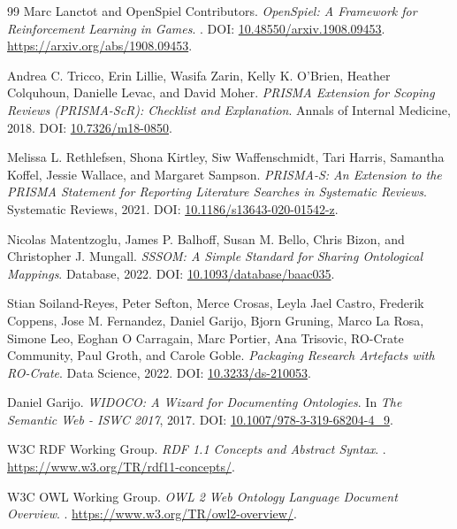 \documentclass[11pt]{article}
\begin{document}
\begin{thebibliography}{99}
Marc Lanctot and OpenSpiel Contributors.
\newblock \emph{OpenSpiel: A Framework for Reinforcement Learning in Games}.
. DOI: \href{https://doi.org/10.48550/arxiv.1908.09453}{10.48550/arxiv.1908.09453}. \url{https://arxiv.org/abs/1908.09453}.

Andrea C. Tricco, Erin Lillie, Wasifa Zarin, Kelly K. O'Brien, Heather Colquhoun, Danielle Levac, and David Moher.
\newblock \emph{PRISMA Extension for Scoping Reviews (PRISMA-ScR): Checklist and Explanation}.
\newblock Annals of Internal Medicine, 2018. DOI: \href{https://doi.org/10.7326/m18-0850}{10.7326/m18-0850}.

Melissa L. Rethlefsen, Shona Kirtley, Siw Waffenschmidt, Tari Harris, Samantha Koffel, Jessie Wallace, and Margaret Sampson.
\newblock \emph{PRISMA-S: An Extension to the PRISMA Statement for Reporting Literature Searches in Systematic Reviews}.
\newblock Systematic Reviews, 2021. DOI: \href{https://doi.org/10.1186/s13643-020-01542-z}{10.1186/s13643-020-01542-z}.

Nicolas Matentzoglu, James P. Balhoff, Susan M. Bello, Chris Bizon, and Christopher J. Mungall.
\newblock \emph{SSSOM: A Simple Standard for Sharing Ontological Mappings}.
\newblock Database, 2022. DOI: \href{https://doi.org/10.1093/database/baac035}{10.1093/database/baac035}.

Stian Soiland-Reyes, Peter Sefton, Merce Crosas, Leyla Jael Castro, Frederik Coppens, Jose M. Fernandez, Daniel Garijo, Bjorn Gruning, Marco La Rosa, Simone Leo, Eoghan O Carragain, Marc Portier, Ana Trisovic, RO-Crate Community, Paul Groth, and Carole Goble.
\newblock \emph{Packaging Research Artefacts with RO-Crate}.
\newblock Data Science, 2022. DOI: \href{https://doi.org/10.3233/ds-210053}{10.3233/ds-210053}.

Daniel Garijo.
\newblock \emph{WIDOCO: A Wizard for Documenting Ontologies}.
\newblock In \emph{The Semantic Web - ISWC 2017}, 2017. DOI: \href{https://doi.org/10.1007/978-3-319-68204-4_9}{10.1007/978-3-319-68204-4\_9}.

W3C RDF Working Group.
\newblock \emph{RDF 1.1 Concepts and Abstract Syntax}.
. \url{https://www.w3.org/TR/rdf11-concepts/}.

W3C OWL Working Group.
\newblock \emph{OWL 2 Web Ontology Language Document Overview}.
. \url{https://www.w3.org/TR/owl2-overview/}.


\end{thebibliography}
\end{document}

